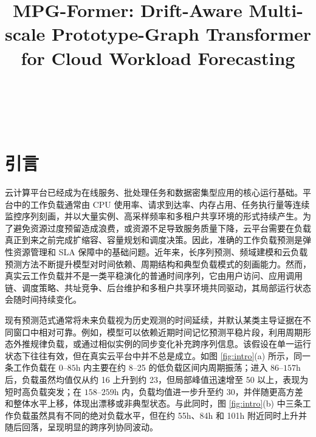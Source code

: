 \documentclass[UTF8]{ctexart}
\makeatletter
\renewcommand{\maketitle}{%
  \begin{center}
    \Large\bfseries \@title \\[10pt]
    \Large \@author \\[20pt]
    \small \@date
  \end{center}
  \vspace{-5pt}
}
\makeatother
\begin{document}
\title{MPG-Former: Drift-Aware Multi-scale Prototype-Graph Transformer for Cloud Workload Forecasting}

\date{}

\maketitle

\section{引言}

\raggedright

云计算平台已经成为在线服务、批处理任务和数据密集型应用的核心运行基础\cite{ghemawat2003gfs,dean2004mapreduce,chang2006bigtable,decandia2007dynamo}。平台中的工作负载通常由 CPU 使用率、请求到达率、内存占用、任务执行量等连续监控序列刻画，并以大量实例、高采样频率和多租户共享环境的形式持续产生\cite{cortez2017resource,ousterhout2013sparrow,gog2016firmament}。为了避免资源过度预留造成浪费，或资源不足导致服务质量下降，云平台需要在负载真正到来之前完成扩缩容、容量规划和调度决策\cite{armbrust2009above,mell2011nist,hindman2011mesos,mao2019decima}。因此，准确的工作负载预测是弹性资源管理和 SLA 保障中的基础问题\cite{cortez2017resource,delimitrou2014quasar,zhang2021sinan}。近年来，长序列预测、频域建模和云负载预测方法不断提升模型对时间依赖、周期结构和典型负载模式的刻画能力\cite{zhou2021informer,wu2021autoformer,wang2023dyn,zhou2024fremer}。然而，真实云工作负载并不是一类平稳演化的普通时间序列，它由用户访问、应用调用链、调度策略、共址竞争、后台维护和多租户共享环境共同驱动，其局部运行状态会随时间持续变化\cite{cortez2017resource,delimitrou2013paragon,lo2015heracles,zhang2021sinan}。

现有预测范式通常将未来负载视为历史观测的时间延续，并默认某类主导证据在不同窗口中相对可靠\cite{lai2018lstnet,oreshkin2020nbeats,zhou2022fedformer}。例如，模型可以依赖近期时间记忆预测平稳片段，利用周期形态外推规律负载，或通过相似实例的同步变化补充跨序列信息。该假设在单一运行状态下往往有效，但在真实云平台中并不总是成立\cite{liu2022nonstationary,kim2021revin}。如图 \ref{fig:intro}(a) 所示，同一条工作负载在 $0$--$85$h 内主要在约 8--25 的低负载区间内周期振荡；进入 $86$--$157$h 后，负载虽然均值仅从约 16 上升到约 23，但局部峰值迅速增至 50 以上，表现为短时高负载突发；在 $158$--$259$h 内，负载均值进一步升至约 30，并伴随更高方差和整体水平上移，体现出漂移或非典型状态。与此同时，图 \ref{fig:intro}(b) 中三条工作负载虽然具有不同的绝对负载水平，但在约 55h、84h 和 101h 附近同时上升并随后回落，呈现明显的跨序列协同波动。
\end{document}
